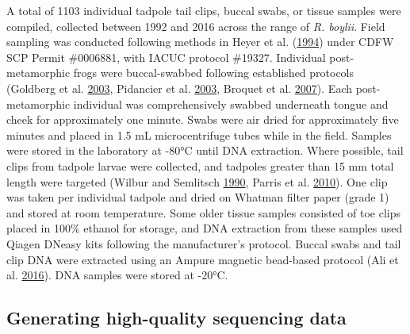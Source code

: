 \documentclass[proquest,12pt,final]{ucthesis-CA2012} %
\begin{document}
\begin{ucmainmatter}
A total of 1103 individual tadpole tail clips, buccal swabs, or tissue
samples were compiled, collected between 1992 and 2016 across the range
of \emph{R. boylii}. Field sampling was conducted following methods in
Heyer et al. (\protect\hyperlink{ref-heyer_measuring_1994}{1994}) under
CDFW SCP Permit \#0006881, with IACUC protocol \#19327. Individual
post-metamorphic frogs were buccal-swabbed following established
protocols (Goldberg et al.
\protect\hyperlink{ref-goldberg_frogs_2003}{2003}, Pidancier et al.
\protect\hyperlink{ref-pidancier_buccal_2003}{2003}, Broquet et al.
\protect\hyperlink{ref-broquet_buccal_2007}{2007}). Each
post-metamorphic individual was comprehensively swabbed underneath
tongue and cheek for approximately one minute. Swabs were air dried for
approximately five minutes and placed in 1.5 mL microcentrifuge tubes
while in the field. Samples were stored in the laboratory at -80°C until
DNA extraction. Where possible, tail clips from tadpole larvae were
collected, and tadpoles greater than 15 mm total length were targeted
(Wilbur and Semlitsch
\protect\hyperlink{ref-wilbur_ecological_1990}{1990}, Parris et al.
\protect\hyperlink{ref-parris_assessing_2010}{2010}). One clip was taken
per individual tadpole and dried on Whatman filter paper (grade 1) and
stored at room temperature. Some older tissue samples consisted of toe
clips placed in 100\% ethanol for storage, and DNA extraction from these
samples used Qiagen DNeasy kits following the manufacturer's protocol.
Buccal swabs and tail clip DNA were extracted using an Ampure magnetic
bead-based protocol (Ali et al.
\protect\hyperlink{ref-ali_rad_2016}{2016}). DNA samples were stored at
-20°C.

\hypertarget{generating-high-quality-sequencing-data}{%
\subsection{Generating high-quality sequencing
data}\label{generating-high-quality-sequencing-data}}


\end{ucmainmatter}
\end{document}
